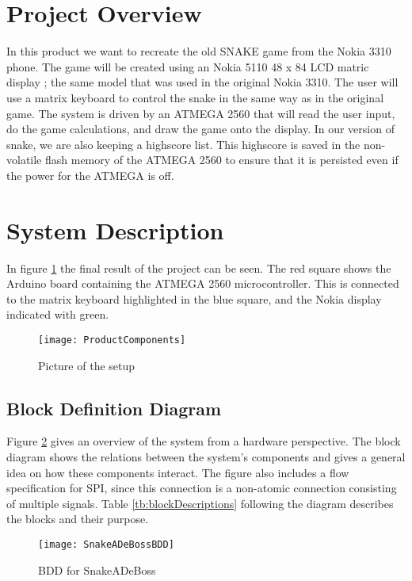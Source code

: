 \section{Project Overview}
	In this product we want to recreate the old SNAKE game from the Nokia 3310 phone. The game will be created using an Nokia 5110 48 x 84 LCD matric display \cite{NokiaDisplay}; the same model that was used in the original Nokia 3310. The user will use a matrix keyboard to control the snake in the same way as in the original game. The system is driven by an ATMEGA 2560 that will read the user input, do the game calculations, and draw the game onto the display. In our version of snake, we are also keeping a highscore list. This highscore is saved in the non-volatile flash memory of the ATMEGA 2560 to ensure that it is persisted even if the power for the ATMEGA is off.

\section{System Description}
	In figure \ref{ProductComponents} the final result of the project can be seen. The red square shows the Arduino board containing the ATMEGA 2560 microcontroller. This is connected to the matrix keyboard highlighted in the blue square, and the Nokia display indicated with green. 
	
	\begin{figure}[H]
		\texttt{[image: ProductComponents]}
		\centering
		\caption{Picture of the setup}
		\label{ProductComponents}
	\end{figure}


	\subsection{Block Definition Diagram}
		Figure \ref{fig:bdd} gives an overview of the system from a hardware perspective. The block diagram shows the relations between the system's components and gives a general idea on how these components interact. The figure also includes a flow specification for SPI, since this connection is a non-atomic connection consisting of multiple signals. Table \ref{tb:blockDescriptions} following the diagram describes the blocks and their purpose.
		
		\begin{figure}[H]
			\texttt{[image: SnakeADeBossBDD]}
			\centering
			\caption{BDD for SnakeADeBoss}
			\label{fig:bdd}
		\end{figure}
		
